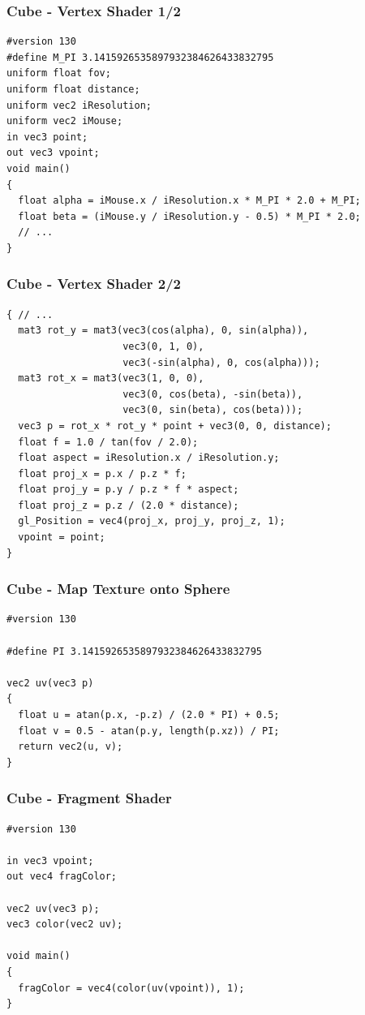 \documentclass[aspectratio=169,11pt,xcolor=dvipsnames]{beamer}
\begin{document}
\begin{frame}[fragile]
  \frametitle{Cube {-} Vertex Shader 1/2}
  \begin{verbatim}
#version 130
#define M_PI 3.1415926535897932384626433832795
uniform float fov;
uniform float distance;
uniform vec2 iResolution;
uniform vec2 iMouse;
in vec3 point;
out vec3 vpoint;
void main()
{
  float alpha = iMouse.x / iResolution.x * M_PI * 2.0 + M_PI;
  float beta = (iMouse.y / iResolution.y - 0.5) * M_PI * 2.0;
  // ...
}
  \end{verbatim}
\end{frame}

\begin{frame}[fragile]
  \frametitle{Cube {-} Vertex Shader 2/2}
  \begin{verbatim}
{ // ...
  mat3 rot_y = mat3(vec3(cos(alpha), 0, sin(alpha)),
                    vec3(0, 1, 0),
                    vec3(-sin(alpha), 0, cos(alpha)));
  mat3 rot_x = mat3(vec3(1, 0, 0),
                    vec3(0, cos(beta), -sin(beta)),
                    vec3(0, sin(beta), cos(beta)));
  vec3 p = rot_x * rot_y * point + vec3(0, 0, distance);
  float f = 1.0 / tan(fov / 2.0);
  float aspect = iResolution.x / iResolution.y;
  float proj_x = p.x / p.z * f;
  float proj_y = p.y / p.z * f * aspect;
  float proj_z = p.z / (2.0 * distance);
  gl_Position = vec4(proj_x, proj_y, proj_z, 1);
  vpoint = point;
}
  \end{verbatim}
\end{frame}

\begin{frame}[fragile]
  \frametitle{Cube {-} Map Texture onto Sphere}
  \begin{verbatim}
#version 130

#define PI 3.1415926535897932384626433832795

vec2 uv(vec3 p)
{
  float u = atan(p.x, -p.z) / (2.0 * PI) + 0.5;
  float v = 0.5 - atan(p.y, length(p.xz)) / PI;
  return vec2(u, v);
}
  \end{verbatim}
\end{frame}

\begin{frame}[fragile]
  \frametitle{Cube {-} Fragment Shader}
  \begin{verbatim}
#version 130

in vec3 vpoint;
out vec4 fragColor;

vec2 uv(vec3 p);
vec3 color(vec2 uv);

void main()
{
  fragColor = vec4(color(uv(vpoint)), 1);
}
  \end{verbatim}
\end{frame}
\end{document}
